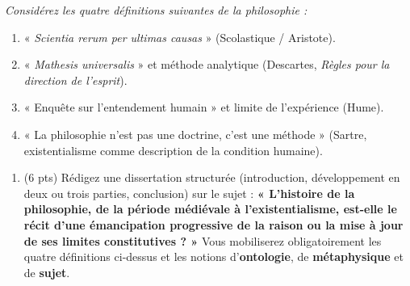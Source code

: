\documentclass[11pt]{article}
\begin{document}
\begin{exercice}
\emph{Considérez les quatre définitions suivantes de la philosophie :}
\begin{enumerate}
    \item « \textit{Scientia rerum per ultimas causas} » (Scolastique / Aristote).
    \item « \textit{Mathesis universalis} » et méthode analytique (Descartes, \textit{Règles pour la direction de l'esprit}).
    \item « Enquête sur l'entendement humain » et limite de l'expérience (Hume).
    \item « La philosophie n'est pas une doctrine, c'est une méthode » (Sartre, existentialisme comme description de la condition humaine).
\end{enumerate}
\begin{enumerate}
    \item (6 pts) Rédigez une dissertation structurée (introduction, développement en deux ou trois parties, conclusion) sur le sujet : \textbf{« L'histoire de la philosophie, de la période médiévale à l'existentialisme, est-elle le récit d'une émancipation progressive de la raison ou la mise à jour de ses limites constitutives ? »} Vous mobiliserez obligatoirement les quatre définitions ci-dessus et les notions d'\textbf{ontologie}, de \textbf{métaphysique} et de \textbf{sujet}.
\end{enumerate}
\end{exercice}
\end{document}
